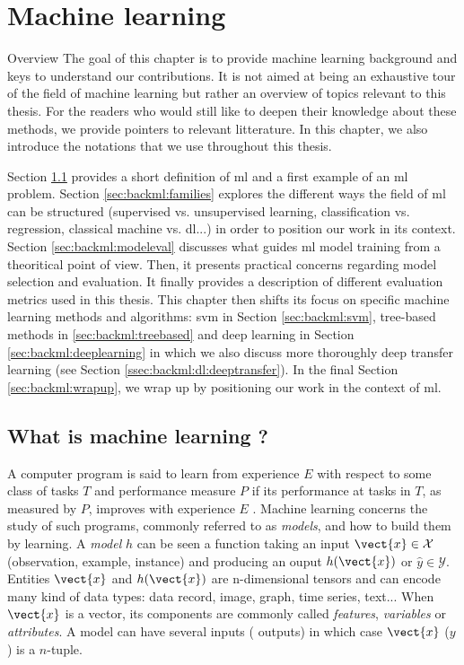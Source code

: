 \chapter{Machine learning}
\label{chap:backml}

\begin{overview}{Overview}
The goal of this chapter is to provide machine learning background and keys to understand our contributions. It is not aimed at being an exhaustive tour of the field of machine learning but rather an overview of topics relevant to this thesis. For the readers who would still like to deepen their knowledge about these methods, we provide pointers to relevant litterature. In this chapter, we also introduce the notations that we use throughout this thesis.

Section \ref{sec:backml:whatisml} provides a short definition of \acrlong{ml} and a first example of an \acrshort{ml} problem. Section \ref{sec:backml:families} explores the different ways the field of \acrlong{ml} can be structured (\eg supervised vs. unsupervised learning, classification vs. regression, classical machine vs. \acrlong{dl}...) in order to position our work in its context. Section \ref{sec:backml:modeleval} discusses what guides \acrlong{ml} model training from a theoritical point of view. Then, it presents practical concerns regarding model selection and evaluation. It finally provides a description of different evaluation metrics used in this thesis. This chapter then shifts its focus on specific machine learning methods and algorithms: \acrlong{svm} in Section \ref{sec:backml:svm}, tree-based methods in \ref{sec:backml:treebased} and deep learning in Section \ref{sec:backml:deeplearning} in which we also discuss more thoroughly deep transfer learning (see Section \ref{ssec:backml:dl:deeptransfer}). In the final Section \ref{sec:backml:wrapup}, we wrap up by positioning our work in the context of \acrlong{ml}.
\end{overview}

\section{What is machine learning ?}
\label{sec:backml:whatisml}

A computer program is said to learn from experience $E$ with respect to some class
of tasks $T$ and performance measure $P$ if its performance at tasks in $T$, as
measured by $P$, improves with experience $E$ \parencite{mitchell1997machine}.
Machine learning concerns the study of such programs, commonly referred to as
\textit{models}, and how to build them by learning. A \textit{model} $h$ can be
seen a function taking an input $\vect{x} \in \mathcal{X}$ (\aka observation,
example, instance) and producing an ouput $h(\vect{x})$ or $\hat{y} \in \mathcal{Y}$.
Entities $\vect{x}$ and $h(\vect{x})$ are n-dimensional tensors and can encode
many kind of data types: data record, image, graph, time series, text... When
$\vect{x}$ is a vector, its components are commonly called \textit{features},
\textit{variables} or \textit{attributes}. A model can have several inputs (\resp
outputs) in which case $\vect{x}$ (\resp $y$) is a $n$-tuple.

